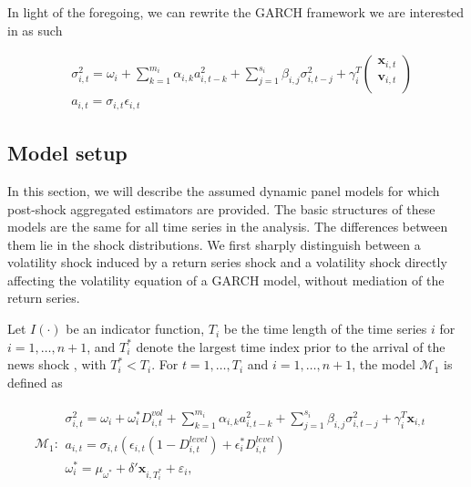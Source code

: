 \documentclass[11pt]{article}
\newcommand{\x}{\textbf{x}}
\def\mbf#1{\mathbf{#1}} %
\def\mc#1{\mathcal{#1}} %
\def\mc#1{\mathcal{#1}}
\theoremstyle{definition}
\begin{document}
In light of the foregoing, we can rewrite the GARCH framework we are interested in as such

\begin{align*}
&\sigma_{i,t}^{2} = \omega_{i} + \sum^{m_{i}}_{k=1}\alpha_{i,k}a^{2}_{i,t-k} + \sum_{j=1}^{s_{i}}\beta_{i,j}\sigma_{i,t-j}^{2} + \gamma_{i}^{T} \begin{pmatrix} \x_{i,t} \\ \textbf{v}_{i,t} \\ \end{pmatrix} \\
&a_{i,t} = \sigma_{i,t}\epsilon_{i,t}
\end{align*}


\subsection{Model setup}
\label{modelsetup}
In this section, we will describe the assumed dynamic panel models for which 
post-shock aggregated estimators are provided. The basic structures of these models 
are the same for all time series in the analysis.  The differences between them lie in the shock distributions.  We first sharply distinguish between a volatility shock induced by a return series shock and a volatility shock directly affecting the volatility equation of a GARCH model, without mediation of the return series.

Let $I(\cdot)$ be an indicator function, $T_i$ be the time length of the time series $i$ for $i = 1, \ldots, n+1$, and $T_i^*$ denote the largest time index prior to the arrival of the news shock , with $T_i^* < T_i$.  For $t= 1, \ldots, T_i$ and $i = 1, \ldots, n+1$, the model $\mc{M}_1$ is defined as

\begin{align*}
  \mc{M}_1 \colon \begin{array}{l}
     \sigma^{2}_{i,t} = \omega_{i} + \omega^{*}_i D^{vol}_{i,t} + \sum^{m_{i}}_{k=1}\alpha_{i,k}a^{2}_{i,t-k} + \sum_{j=1}^{s_{i}}\beta_{i,j}\sigma_{i,t-j}^{2} + \gamma_{i}^{T} \x_{i,t} \text{ }\\[.2cm]
     a_{i,t} = \sigma_{i,t}(\epsilon_{i,t}(1-D^{level}_{i,t}) + \epsilon^{*}_{i}D^{level}_{i,t})\\[.2cm]
     \omega_i^{*} = \mu_{\omega^{*}}+\delta'\mbf{x}_{i, T_i^*}+ \varepsilon_{i},
  \end{array}
  \end{align*}
\end{document}
